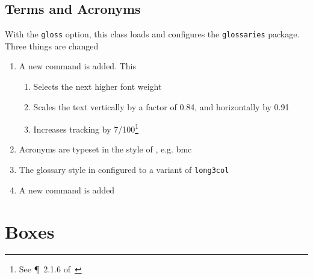 \documentclass[solid,math,chem,code,plot,gloss]{bmc}
\begin{document}
\subsection{Terms and Acronyms}
With the \texttt{gloss} option, this class loads and configures the
\texttt{glossaries} package. Three things are changed
\begin{enumerate}
    \item A new command \texttt{} is added. This
    \begin{enumerate}
        \item Selects the next higher font weight
        \item Scales the text vertically by a factor of 0.84, and horizontally by 0.91
        \item Increases \gls{tracking} by 7/100\footnote{See \P~2.1.6 of~\cite{Bringhurst_2004}}
    \end{enumerate}
    \item Acronyms are typeset in the style of \texttt{\acr}, e.g. \gls{bmc}
    \item The glossary style in configured to a variant of \texttt{long3col}
    \item A new command \texttt{} is added
\end{enumerate}

\section{Boxes}
\end{document}
